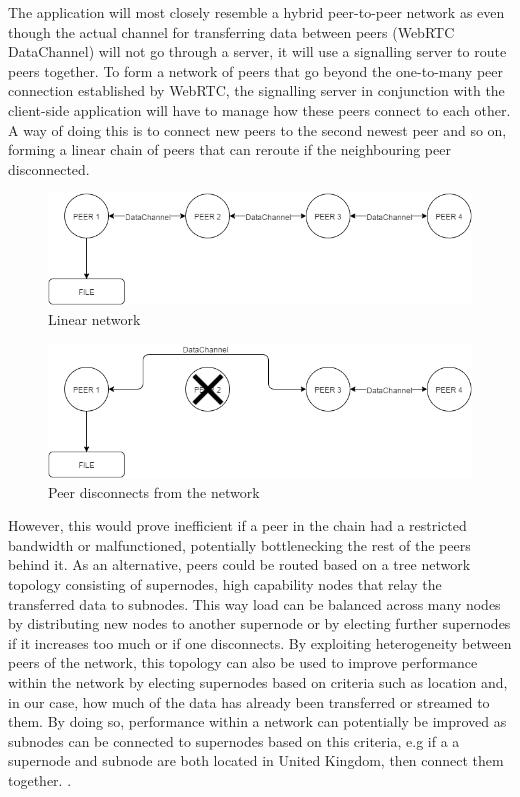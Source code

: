 \documentclass[]{report}
\begin{document}
			The application will most closely resemble a hybrid peer-to-peer network as even though the actual channel for transferring data between peers (WebRTC DataChannel) will not go through a server, it will use a signalling server to route peers together. To form a network of peers that go beyond the one-to-many peer connection established by WebRTC, the signalling server in conjunction with the client-side application will have to manage how these peers connect to each other. A way of doing this is to connect new peers to the second newest peer and so on, forming a linear chain of peers that can reroute if the neighbouring peer disconnected.	
			\begin{figure}[h!]
				\centering
				\caption{Linear network}
				\includegraphics[scale=0.4]{network.png}
			\end{figure}
			\begin{figure}[h!]
				\centering
				\caption{Peer disconnects from the network}
				\includegraphics[scale=0.4]{peerdisconnect.png}
			\end{figure}
			However, this would prove inefficient if a peer in the chain had a restricted bandwidth or malfunctioned, potentially bottlenecking the rest of the peers behind it. As an alternative, peers could be routed based on a tree network topology \cite{Tree Topology} consisting of supernodes, high capability nodes that relay the transferred data to subnodes. This way load can be balanced across many nodes by distributing new nodes to another supernode or by electing further supernodes if it increases too much or if one disconnects. By exploiting heterogeneity between peers of the network, this topology can also be used to improve performance within the network by electing supernodes based on criteria such as location and, in our case, how much of the data has already been transferred or streamed to them. By doing so, performance within a network can potentially be improved as subnodes can be connected to supernodes based on this criteria, e.g if a a supernode and subnode are both located in United Kingdom, then connect them together. \cite{Supernodes}.		
\end{document}
